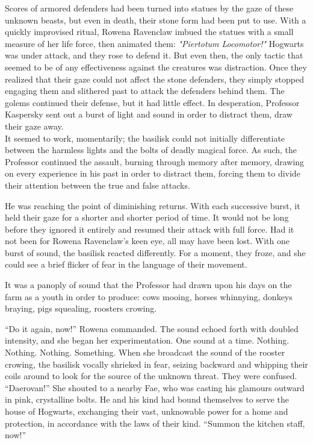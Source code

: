 Scores of armored defenders had been turned into statues by the gaze of these unknown beasts, but even in death, their stone form had been put to use. With a quickly improvised ritual, Rowena Ravenclaw imbued the statues with a small measure of her life force, then animated them:
\SmallVSpace
\emph{"Piertotum Locomotor!"}
\SmallVSpace
Hogwarts was under attack, and they rose to defend it. But even then, the only tactic that seemed to be of any effectiveness against the creatures was distraction. Once they realized that their gaze could not affect the stone defenders, they simply stopped engaging them and slithered past to attack the defenders behind them. The golems continued their defense, but it had little effect.
\SmallVSpace
In desperation, Professor Kaspersky sent out a burst of light and sound in order to distract them, draw their gaze away.\\It seemed to work, momentarily; the basilisk could not initially differentiate between the harmless lights and the bolts of deadly magical force. As such, the Professor continued the assault, burning through memory after memory, drawing on every experience in his past in order to distract them, forcing them to divide their attention between the true and false attacks.

He was reaching the point of diminishing returns. With each successive burst, it held their gaze for a shorter and shorter period of time. It would not be long before they ignored it entirely and resumed their attack with full force. Had it not been for Rowena Ravenclaw’s keen eye, all may have been lost. With one burst of sound, the basilisk reacted differently. For a moment, they froze, and she could see a brief flicker of fear in the language of their movement.

It was a panoply of sound that the Professor had drawn upon his days on the farm as a youth in order to produce: cows mooing, horses whinnying, donkeys braying, pigs squealing, roosters crowing.

“Do it again, now!” Rowena commanded. The sound echoed forth with doubled intensity, and she began her experimentation. One sound at a time.
\SmallVSpace
Nothing.
\SmallVSpace
Nothing.
\SmallVSpace
Nothing.
\SmallVSpace
Something.
\SmallVSpace
When she broadcast the sound of the rooster crowing, the basilisk vocally shrieked in fear, seizing backward and whipping their coils around to look for the source of the unknown threat. They were confused.
\SmallVSpace
“Daerovan!” She shouted to a nearby Fae, who was casting his glamours outward in pink, crystalline bolts. He and his kind had bound themselves to serve the house of Hogwarts, exchanging their vast, unknowable power for a home and protection, in accordance with the laws of their kind. “Summon the kitchen staff, now!”

